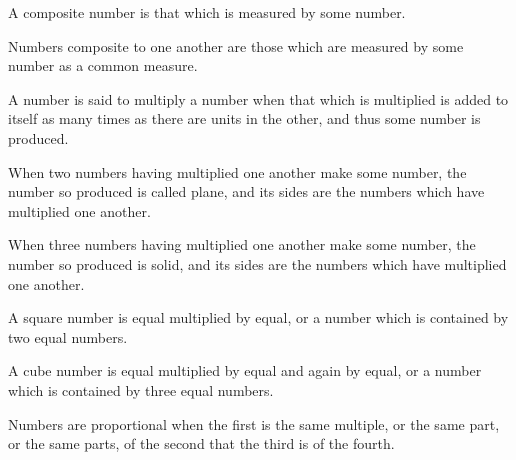 \begin{scope}
\label{def:VII.13}
A composite number is that which is measured by some number.
\end{scope}

\begin{scope}
\label{def:VII.14}
Numbers composite to one another are those which are measured by some
number as a common measure.
\end{scope}

\begin{scope}
\label{def:VII.15}
A number is said to multiply a number when that which is multiplied
is added to itself as many times as there are units in the other, and
thus some number is produced.
\end{scope}

\begin{scope}
\label{def:VII.16}
When two numbers having multiplied one another make some number, the
number so produced is called plane, and its sides are the numbers
which have multiplied one another.
\end{scope}

\begin{scope}
\label{def:VII.17}
When three numbers having multiplied one another make some number,
the number so produced is solid, and its sides are the numbers which
have multiplied one another.
\end{scope}

\begin{scope}
\label{def:VII.18}
A square number is equal multiplied by equal, or a number which is
contained by two equal numbers.
\end{scope}

\begin{scope}
\label{def:VII.19}
A cube number is equal multiplied by equal and again by equal, or a
number which is contained by three equal numbers.
\end{scope}

\begin{scope}
\label{def:VII.20}
Numbers are proportional when the first is the same multiple, or the
same part, or the same parts, of the second that the third is of the
fourth.
\end{scope}

